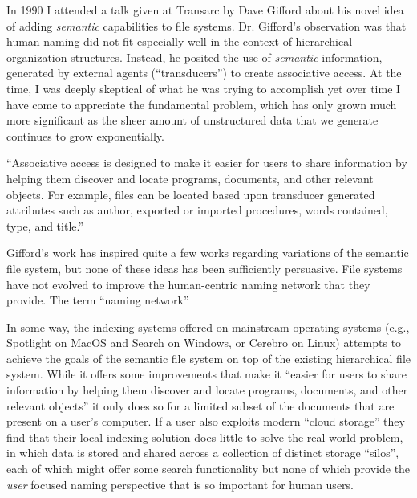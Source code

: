 
In 1990 I attended a talk given at Transarc by Dave Gifford about his novel idea of adding
\emph{semantic} capabilities to file systems.  Dr. Gifford's observation was
that human naming did not fit especially well in the context of hierarchical
organization structures.  Instead, he posited the use of \emph{semantic}
information, generated by external agents (``transducers'') to create
associative access.  At the time, I was deeply skeptical of what he was trying
to accomplish yet over time I have come to appreciate the fundamental problem,
which has only grown much more significant as the sheer amount of unstructured
data that we generate continues to grow exponentially.

``Associative access is designed to make it easier for users
to share information by helping them discover and locate
programs, documents, and other relevant objects. For example,
files can be located based upon transducer generated
attributes such as author, exported or imported procedures,
words contained, type, and title.''~\cite{gifford1991semantic}

Gifford's work has inspired quite a few works regarding variations of the
semantic file system, but none of these ideas has been sufficiently persuasive.
File systems have not evolved to improve the human-centric naming network that
they provide.  The term ``naming network''

In some way, the indexing systems offered on mainstream operating systems (e.g.,
Spotlight on MacOS and Search on Windows, or Cerebro on Linux) attempts to
achieve the goals of the semantic file system on top of the existing
hierarchical file system.  While it offers some improvements that make it
``easier for users to share information by helping them discover and locate
programs, documents, and other relevant objects'' it only does so for a limited
subset of the documents that are present on a user's computer.  If a user also
exploits modern ``cloud storage'' they find that their local indexing solution
does little to solve the real-world problem, in which data is stored and shared
across a collection of distinct storage ``silos'', each of which might offer
some search functionality but none of which provide the \emph{user} focused
naming perspective that is so important for human users.

